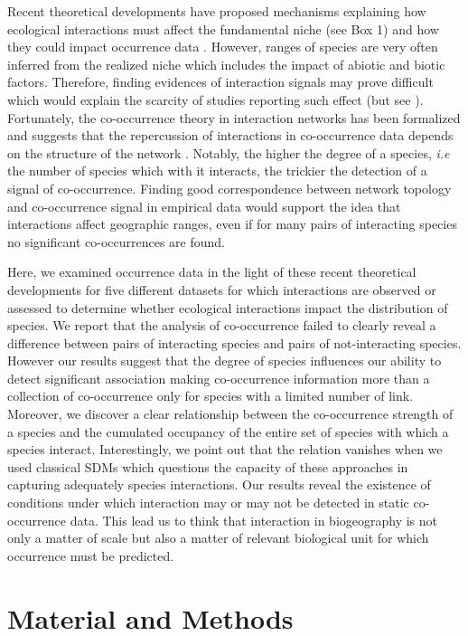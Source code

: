 Recent theoretical developments have proposed mechanisms explaining how
ecological interactions must affect the fundamental niche (see Box 1)
and how they could impact occurrence data \citep{Holt2009, Araujo2014}.
However, ranges of species are very often inferred from the realized
niche which includes the impact of abiotic and biotic factors.
Therefore, finding evidences of interaction signals may prove difficult
which would explain the scarcity of studies reporting such effect (but
see \citet{Gotelli2010}). Fortunately, the co-occurrence theory in
interaction networks has been formalized and suggests that the
repercussion of interactions in co-occurrence data depends on the
structure of the network \citep{Cazelles2016}. Notably, the higher the
degree of a species, \emph{i.e} the number of species which with it
interacts, the trickier the detection of a signal of co-occurrence.
Finding good correspondence between network topology and co-occurrence
signal in empirical data would support the idea that interactions affect
geographic ranges, even if for many pairs of interacting species no
significant co-occurrences are found.

Here, we examined occurrence data in the light of these recent
theoretical developments for five different datasets for which
interactions are observed or assessed to determine whether ecological
interactions impact the distribution of species. We report that the
analysis of co-occurrence failed to clearly reveal a difference between
pairs of interacting species and pairs of not-interacting species.
However our results suggest that the degree of species influences our
ability to detect significant association making co-occurrence
information more than a collection of co-occurrence only for species
with a limited number of link. Moreover, we discover a clear
relationship between the co-occurrence strength of a species and the
cumulated occupancy of the entire set of species with which a species
interact. Interestingly, we point out that the relation vanishes when we
used classical SDMs which questions the capacity of these approaches in
capturing adequately species interactions. Our results reveal the
existence of conditions under which interaction may or may not be
detected in static co-occurrence data. This lead us to think that
interaction in biogeography is not only a matter of scale but also a
matter of relevant biological unit for which occurrence must be
predicted.

\section{Material and Methods}\label{material-and-methods}

